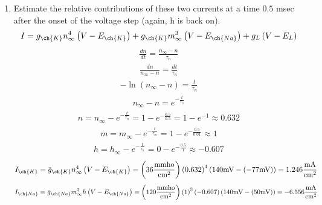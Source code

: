 \documentclass[11pt]{article}
\begin{document}
\begin{enumerate}[label=\arabic*.]
\begin{enumerate}[label=(\alph*)]
\begin{enumerate}[label=(\roman*)]
\item
Estimate the relative contributions of these two currents at a time $0.5$ msec after the onset of the voltage step (again, h is back on).
\begin{align*}
I = g_{\ch{K}} n_{\infty}^4 \left(V - E_{\ch{K}}\right) + g_{\ch{K}} m_{\infty}^3 \left(V - E_{\ch{Na}}\right) + g_L \left(V - E_L\right)
\end{align*}
\begin{align*}
\frac{dn} {dt} = \frac{n_{\infty} - n} {\tau_n}
\end{align*}
\begin{align*}
\frac{dn} {n_{\infty} - n} = \frac{dt} {\tau_n}
\end{align*}
\begin{align*}
-\ln{(n_{\infty} - n)} = \frac{t} {\tau_n}
\end{align*}
\begin{align*}
n_{\infty} - n = e^{-\frac{t} {\tau_n}}
\end{align*}
\begin{align*}
n = n_{\infty} - e^{-\frac{t} {\tau_n}} = 1 - e^{-\frac{0.5} {0.5}} = 1 - e^{-1} \approx 0.632
\end{align*}
\begin{align*}
m = m_{\infty} - e^{-\frac{t} {\tau_m}} = 1 - e^{-\frac{0.5} {0.01}} \approx 1
\end{align*}
\begin{align*}
h = h_{\infty} - e^{-\frac{t} {\tau_h}} = 0 - e^{-\frac{0.5} {1}} \approx -0.607
\end{align*}
\begin{align*}
I_{\ch{K}} = \bar{g}_{\ch{K}} n_{\infty}^4 \left(V - E_{\ch{K}}\right) = \left(36 \frac{\text{mmho}} {\text{cm}^2}\right) \left(0.632\right)^4 \left(140 \text{mV} - (-77 \text{mV})\right) = 1.246 \frac{\text{mA}} {\text{cm}^2}
\end{align*}
\begin{align*}
I_{\ch{Na}} = \bar{g}_{\ch{Na}} m_{\infty}^3 h \left(V - E_{\ch{Na}}\right) = \left(120 \frac{\text{mmho}} {\text{cm}^2}\right) \left(1\right)^3 \left(-0.607\right) \left(140 \text{mV} - (50 \text{mV})\right) = -6.556 \frac{\text{mA}} {\text{cm}^2}
\end{align*}
\end{enumerate}
\end{enumerate}




\end{enumerate}
\end{document}

